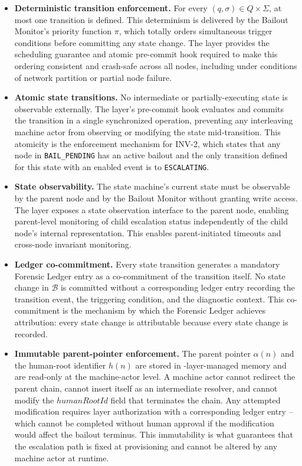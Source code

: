 \begin{itemize}\itemsep=0pt
\item[(\textit{i})] \textbf{Deterministic transition enforcement.} For every
$(q, \sigma) \in Q \times \Sigma$, at most one transition is defined. This determinism
is delivered by the Bailout Monitor's priority function $\pi$, which totally orders
simultaneous trigger conditions before committing any state change. The \fact{} layer
provides the scheduling guarantee and atomic pre-commit hook required to make this
ordering consistent and crash-safe across all nodes, including under conditions of
network partition or partial node failure.

\item[(\textit{ii})] \textbf{Atomic state transitions.} No intermediate or
partially-executing state is observable externally. The \fact{} layer's pre-commit hook
evaluates and commits the transition in a single synchronized operation, preventing
any interleaving machine actor from observing or modifying the state mid-transition.
This atomicity is the enforcement mechanism for INV-2, which states that any node in
\texttt{BAIL\_PENDING} has an active bailout and the only transition defined for this
state with an enabled event is to \texttt{ESCALATING}.

\item[(\textit{iii})] \textbf{State observability.} The state machine's current state
must be observable by the parent node and by the Bailout Monitor without granting
write access. The \fact{} layer exposes a state observation interface to the parent
node, enabling parent-level monitoring of child escalation status independently of the
child node's internal representation. This enables parent-initiated timeouts and
cross-node invariant monitoring.

\item[(\textit{iv})] \textbf{Ledger co-commitment.} Every state transition generates a
mandatory Forensic Ledger entry as a co-commitment of the transition itself. No state
change in $\mathcal{B}$ is committed without a corresponding ledger entry recording the
transition event, the triggering condition, and the diagnostic context. This
co-commitment is the mechanism by which the Forensic Ledger achieves attribution:
every state change is attributable because every state change is recorded.

\item[(\textit{v})] \textbf{Immutable parent-pointer enforcement.} The parent pointer
$\alpha(n)$ and the human-root identifier $h(n)$ are stored in \fact-layer-managed
memory and are read-only at the machine-actor level. A machine actor cannot redirect
the parent chain, cannot insert itself as an intermediate resolver, and cannot modify
the $humanRootId$ field that terminates the chain. Any attempted modification requires
\purpose{} layer authorization with a corresponding ledger entry -- which cannot be
completed without human approval if the modification would affect the bailout terminus.
This immutability is what guarantees that the escalation path is fixed at provisioning
and cannot be altered by any machine actor at runtime.
\end{itemize}

